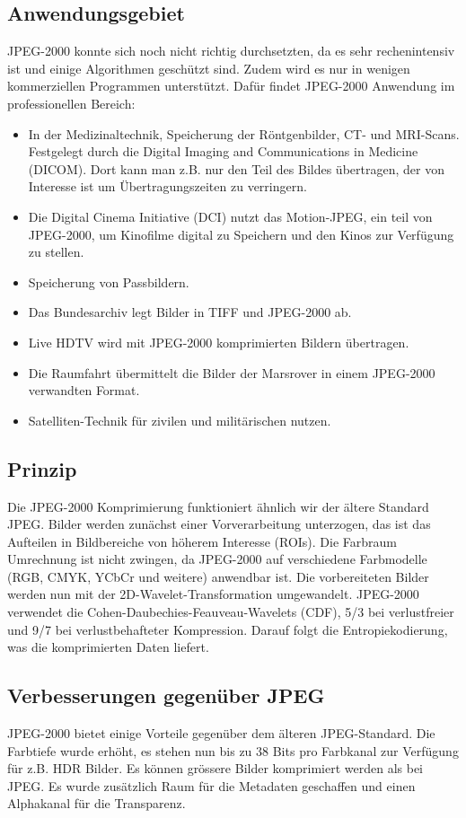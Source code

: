 \subsection{Anwendungsgebiet
\label{jpeg:subsection:anwendungsgebiet}}
JPEG-2000 konnte sich noch nicht richtig durchsetzten, da es sehr rechenintensiv ist und einige Algorithmen geschützt sind.
Zudem wird es nur in wenigen kommerziellen Programmen unterstützt.
Dafür findet JPEG-2000 Anwendung im professionellen Bereich:
\begin{itemize}
    \item In der Medizinaltechnik, Speicherung der Röntgenbilder, CT- und MRI-Scans.
    Festgelegt durch die Digital Imaging and Communications in Medicine (DICOM).
    Dort kann man z.B. nur den Teil des Bildes übertragen, der von Interesse ist um Übertragungszeiten zu verringern.
    \item Die Digital Cinema Initiative (DCI) nutzt das Motion-JPEG, ein teil von JPEG-2000, um Kinofilme digital zu Speichern und den Kinos zur Verfügung zu stellen.
    \item Speicherung von Passbildern.
    \item Das Bundesarchiv legt Bilder in TIFF und JPEG-2000 ab.
    \item Live HDTV wird mit JPEG-2000 komprimierten Bildern übertragen.
    \item Die Raumfahrt übermittelt die Bilder der Marsrover in einem JPEG-2000 verwandten Format.
    \item Satelliten-Technik für zivilen und militärischen nutzen.   
\end{itemize}


\subsection{Prinzip
\label{jpeg:subsection:prinzip}}
Die JPEG-2000 Komprimierung funktioniert ähnlich wir der ältere Standard JPEG.
Bilder werden zunächst einer Vorverarbeitung unterzogen, das ist das Aufteilen in Bildbereiche von höherem Interesse (ROIs).
Die Farbraum Umrechnung ist nicht zwingen, da JPEG-2000 auf verschiedene Farbmodelle (RGB, CMYK, YCbCr und weitere) anwendbar ist.
Die vorbereiteten Bilder werden nun mit der 2D-Wavelet-Transformation umgewandelt.
JPEG-2000 verwendet die Cohen-Daubechies-Feauveau-Wavelets (CDF), 5/3 bei verlustfreier und 9/7 bei verlustbehafteter Kompression.
Darauf folgt die Entropiekodierung, was die komprimierten Daten liefert. 

\subsection{Verbesserungen gegenüber JPEG
\label{jpeg:subsection:verbesserungen}}
JPEG-2000 bietet einige Vorteile gegenüber dem älteren JPEG-Standard.
Die Farbtiefe wurde erhöht, es stehen nun bis zu 38 Bits pro Farbkanal zur Verfügung für z.B. HDR Bilder.
Es können grössere Bilder komprimiert werden als bei JPEG.
Es wurde zusätzlich Raum für die Metadaten geschaffen und einen Alphakanal für die Transparenz.
 
